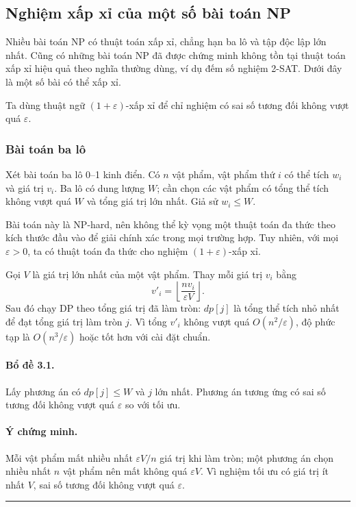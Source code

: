 \documentclass[11pt]{article}
\begin{document}
\subsection{Nghiệm xấp xỉ của một số bài toán NP}

Nhiều bài toán NP có thuật toán xấp xỉ, chẳng hạn ba lô và tập độc lập lớn
nhất. Cũng có những bài toán NP đã được chứng minh không tồn tại thuật toán xấp
xỉ hiệu quả theo nghĩa thường dùng, ví dụ đếm số nghiệm 2-SAT. Dưới đây là một
số bài có thể xấp xỉ.

Ta dùng thuật ngữ $(1+\varepsilon)$-xấp xỉ để chỉ nghiệm có sai số tương đối
không vượt quá $\varepsilon$.

\subsubsection{Bài toán ba lô}

Xét bài toán ba lô 0--1 kinh điển. Có $n$ vật phẩm, vật phẩm thứ $i$ có thể
tích $w_i$ và giá trị $v_i$. Ba lô có dung lượng $W$; cần chọn các vật phẩm có
tổng thể tích không vượt quá $W$ và tổng giá trị lớn nhất. Giả sử
$w_i\le W$.

Bài toán này là NP-hard, nên không thể kỳ vọng một thuật toán đa thức theo kích
thước đầu vào để giải chính xác trong mọi trường hợp. Tuy nhiên, với mọi
$\varepsilon>0$, ta có thuật toán đa thức cho nghiệm $(1+\varepsilon)$-xấp xỉ.

Gọi $V$ là giá trị lớn nhất của một vật phẩm. Thay mỗi giá trị $v_i$ bằng
\[
  v'_i=\left\lfloor \frac{n v_i}{\varepsilon V}\right\rfloor .
\]
Sau đó chạy DP theo tổng giá trị đã làm tròn: $dp[j]$ là tổng thể tích nhỏ nhất
để đạt tổng giá trị làm tròn $j$. Vì tổng $v'_i$ không vượt quá
$O(n^2/\varepsilon)$, độ phức tạp là $O(n^3/\varepsilon)$ hoặc tốt hơn với cài
đặt chuẩn.

\paragraph{Bổ đề 3.1.}
Lấy phương án có $dp[j]\le W$ và $j$ lớn nhất. Phương án tương ứng có sai số
tương đối không vượt quá $\varepsilon$ so với tối ưu.

\paragraph{Ý chứng minh.}
Mỗi vật phẩm mất nhiều nhất $\varepsilon V/n$ giá trị khi làm tròn; một phương
án chọn nhiều nhất $n$ vật phẩm nên mất không quá $\varepsilon V$. Vì nghiệm
tối ưu có giá trị ít nhất $V$, sai số tương đối không vượt quá
$\varepsilon$. \hfill\rule{0.55em}{0.55em}
\end{document}
